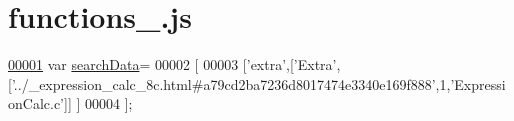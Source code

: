 \hypertarget{functions__1_8js_source}{\section{functions\+\_.\+js}
\label{functions__1_8js_source}
}

\begin{DoxyCode}
\hypertarget{functions__1_8js_source_l00001}{}\hyperlink{functions__1_8js_ad01a7523f103d6242ef9b0451861231e}{00001} var \hyperlink{functions__1_8js_ad01a7523f103d6242ef9b0451861231e}{searchData}=
00002 [
00003   [\textcolor{stringliteral}{'extra'},[\textcolor{stringliteral}{'Extra'},[\textcolor{stringliteral}{'../\_expression\_calc\_8c.html#a79cd2ba7236d8017474e3340e169f888'},1,\textcolor{stringliteral}{'ExpressionCalc.c'}]]
      ]
00004 ];
\end{DoxyCode}
